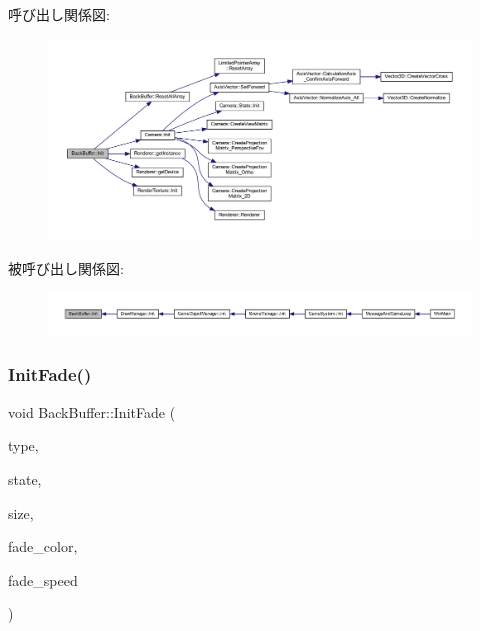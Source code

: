 呼び出し関係図\+:
\nopagebreak
\begin{figure}[H]
\begin{center}
\leavevmode
\includegraphics[width=350pt]{class_back_buffer_a65ac0a652db2a558ecda120ef3f47a10_cgraph}
\end{center}
\end{figure}
被呼び出し関係図\+:
\nopagebreak
\begin{figure}[H]
\begin{center}
\leavevmode
\includegraphics[width=350pt]{class_back_buffer_a65ac0a652db2a558ecda120ef3f47a10_icgraph}
\end{center}
\end{figure}
\mbox{\label{class_back_buffer_add3a034c7758dc6a72bb4582bf6ce78e}} 
\subsubsection{\texorpdfstring{Init\+Fade()}{InitFade()}}
{\footnotesize\ttfamily void Back\+Buffer\+::\+Init\+Fade (\begin{DoxyParamCaption}\item[{\mbox{\hyperlink{class_fade_ac06f27215b454aa05b93c236476d6e80}{Fade\+::\+Type}}}]{type,  }\item[{\mbox{\hyperlink{class_fade_ae77826bf3ff2ab95fb7b3b6f95cba80a}{Fade\+::\+State}}}]{state,  }\item[{\mbox{\hyperlink{_vector3_d_8h_a5ef6e95dfc5f9d3820b71772d99bbc25}{Vec2}}}]{size,  }\item[{\mbox{\hyperlink{_vector3_d_8h_a680c30c4a07d86fe763c7e01169cd6cc}{X\+Color4}}}]{fade\+\_\+color,  }\item[{float}]{fade\+\_\+speed }\end{DoxyParamCaption})}



